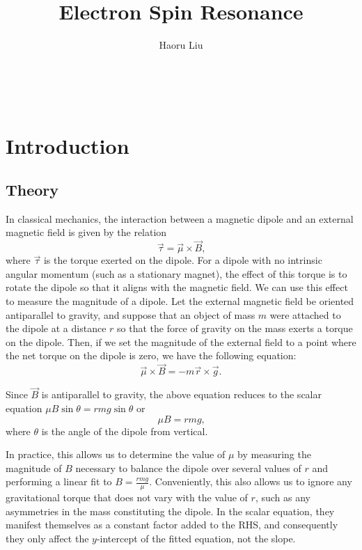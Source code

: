\documentclass{amsart}
\title{Electron Spin Resonance}
\author{Haoru Liu}
\numberwithin{equation}{section}
\begin{document}
\maketitle
{\\}
\tableofcontents
\section{Introduction}
\subsection{Theory}
In classical mechanics, the interaction between a magnetic dipole and an external magnetic field is given by the relation
\begin{equation}
\vec{\tau}=\vec{\mu}\times\vec{B}\text{,}
\end{equation}
where $\vec{\tau}$ is the torque exerted on the dipole. For a dipole with no intrinsic angular momentum (such as a stationary magnet), the effect of this torque is to rotate the dipole so that it aligns with the magnetic field. We can use this effect to measure the magnitude of a dipole. Let the external magnetic field be oriented antiparallel to gravity, and suppose that an object of mass $m$ were attached to the dipole at a distance $r$ so that the force of gravity on the mass exerts a torque on the dipole. Then, if we set the magnitude of the external field to a point where the net torque on the dipole is zero, we have the following equation:
\begin{equation*}
\vec{\mu}\times\vec{B}=-m\vec{r}\times\vec{g}\text{.}
\end{equation*}

Since $\vec{B}$ is antiparallel to gravity, the above equation reduces to the scalar equation $\mu B\sin\theta=rmg\sin\theta$ or 
\begin{equation}
\label{gravfiteqn}
\mu B=rmg\text{,}
\end{equation} 
where $\theta$ is the angle of the dipole from vertical.

In practice, this allows us to determine the value of $\mu$ by measuring the magnitude of $B$ necessary to balance the dipole over several values of $r$ and performing a linear fit to $B=\frac{rmg}{\mu}$. Conveniently, this also allows us to ignore any gravitational torque that does not vary with the value of $r$, such as any asymmetries in the mass constituting the dipole. In the scalar equation, they manifest themselves as a constant factor added to the RHS, and consequently they only affect the $y$-intercept of the fitted equation, not the slope.
\end{document}
